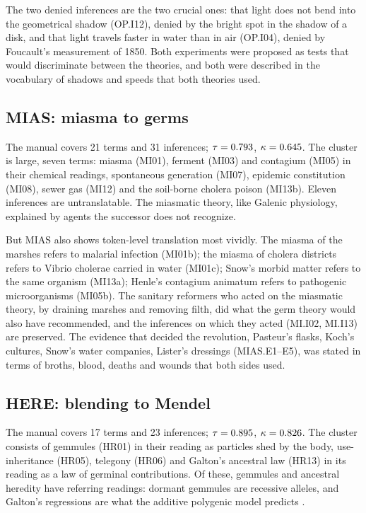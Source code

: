 \documentclass{situationist-preprint}
\begin{document}
The two denied inferences are the two crucial ones: that light does not bend into the geometrical shadow (OP.I12), denied by the bright spot in the shadow of a disk, and that light travels faster in water than in air (OP.I04), denied by Foucault's measurement of 1850. Both experiments were proposed as tests that would discriminate between the theories, and both were described in the vocabulary of shadows and speeds that both theories used.

\subsection{MIAS: miasma to germs}

The manual covers 21 terms and 31 inferences; $\tau = 0.793$, $\kappa = 0.645$. The cluster is large, seven terms: miasma (MI01), ferment (MI03) and contagium (MI05) in their chemical readings, spontaneous generation (MI07), epidemic constitution (MI08), sewer gas (MI12) and the soil-borne cholera poison (MI13b). Eleven inferences are untranslatable. The miasmatic theory, like Galenic physiology, explained by agents the successor does not recognize.

But MIAS also shows token-level translation most vividly. The miasma of the marshes refers to malarial infection (MI01b); the miasma of cholera districts refers to Vibrio cholerae carried in water (MI01c); Snow's morbid matter refers to the same organism (MI13a); Henle's contagium animatum refers to pathogenic microorganisms (MI05b). The sanitary reformers who acted on the miasmatic theory, by draining marshes and removing filth, did what the germ theory would also have recommended, and the inferences on which they acted (MI.I02, MI.I13) are preserved. The evidence that decided the revolution, Pasteur's flasks, Koch's cultures, Snow's water companies, Lister's dressings (MIAS.E1--E5), was stated in terms of broths, blood, deaths and wounds that both sides used.

\subsection{HERE: blending to Mendel}

The manual covers 17 terms and 23 inferences; $\tau = 0.895$, $\kappa = 0.826$. The cluster consists of gemmules (HR01) in their reading as particles shed by the body, use-inheritance (HR05), telegony (HR06) and Galton's ancestral law (HR13) in its reading as a law of germinal contributions. Of these, gemmules and ancestral heredity have referring readings: dormant gemmules are recessive alleles, and Galton's regressions are what the additive polygenic model predicts \citep{Fisher1918}.
\end{document}
